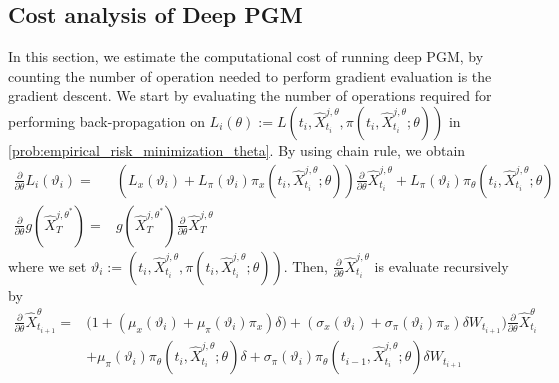 \documentclass{article}
\numberwithin{equation}{section}
\begin{document}
\subsection{Cost analysis of Deep PGM}
\label{sec:cost}
In this section, we estimate the computational cost of running deep PGM, by counting the number of operation needed to perform gradient evaluation is the gradient descent. 
We start by evaluating the number of operations required for performing back-propagation on $L_i(\theta):=L(t_{i},\hat{X}^{j,\theta}_{t_{i}},\pi(t_{i},\hat{X}^{j,\theta}_{t_{i}};\theta))$
in \eqref{prob:empirical_risk_minimization_theta}.  By using chain rule, we obtain
\begin{equation}\label{L_theta}
\begin{split}
        \frac{\partial}{\partial\theta} L_i(\vartheta_i)=&(L_x(\vartheta_i)+L_{\pi}(\vartheta_i)\pi_x(t_{i},\hat{X}^{j,\theta}_{t_{i}};\theta))\frac{\partial}{\partial\theta}\hat{X}^{j,\theta}_{t_{i}}+L_\pi(\vartheta_i)\pi_\theta(t_{i},\hat{X}^{j,\theta}_{t_{i}};\theta)\\
        \frac{\partial}{\partial\theta} g(\hat{X}_T^{j,\theta^{*}}) = & g(\hat{X}_T^{j,\theta^{*}})\frac{\partial}{\partial\theta}\hat{X}^{j,\theta}_{T}
\end{split}
\end{equation}
where we set  $\vartheta_i:=(t_{i},\hat{X}^{j,\theta}_{t_{i}},\pi(t_{i},\hat{X}^{j,\theta}_{t_{i}};\theta))$. Then, $\frac{\partial}{\partial\theta}\hat{X}^{j,\theta}_{t_{i}}$ is evaluate recursively by 
\begin{equation}\label{hatX_theta}
    \begin{split}
        \frac{\partial}{\partial\theta}\hat{X}^\theta_{t_{i+1}}
        =& \Big(1+(\mu_x(\vartheta_i)+\mu_\pi(\vartheta_i)\pi_x)\delta)+(\sigma_x(\vartheta_i)+\sigma_\pi(\vartheta_i)\pi_x)\delta W_{{t_{i+1}}}\Big)\frac{\partial}{\partial\theta}\hat{X}^\theta_{t_{i}}\\
        &+\mu_\pi(\vartheta_i) \pi_\theta(t_{i},\hat{X}^{j,\theta}_{t_{i}};\theta)\delta+\sigma_\pi(\vartheta_i)\pi_\theta(t_{i-1},\hat{X}^{j,\theta}_{t_{i}};\theta)\delta W_{{t_{i+1}}}
    \end{split}
\end{equation}
\end{document}
